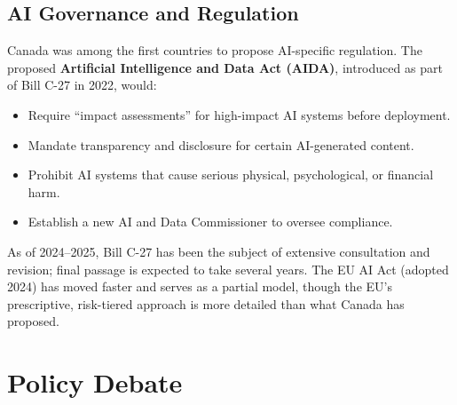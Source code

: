 \subsection{AI Governance and Regulation}

Canada was among the first countries to propose AI-specific regulation. The proposed \textbf{Artificial Intelligence and Data Act (AIDA)}, introduced as part of Bill C-27 in 2022, would:

\begin{itemize}
  \item Require ``impact assessments'' for high-impact AI systems before deployment.
  \item Mandate transparency and disclosure for certain AI-generated content.
  \item Prohibit AI systems that cause serious physical, psychological, or financial harm.
  \item Establish a new AI and Data Commissioner to oversee compliance.
\end{itemize}

As of 2024--2025, Bill C-27 has been the subject of extensive consultation and revision; final passage is expected to take several years. The EU AI Act (adopted 2024) has moved faster and serves as a partial model, though the EU's prescriptive, risk-tiered approach is more detailed than what Canada has proposed.

\section{Policy Debate}

